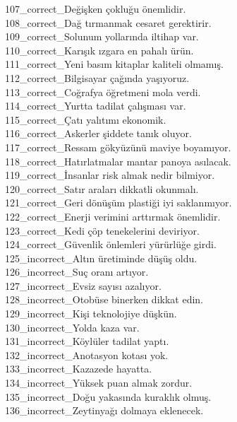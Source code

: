 \begin{myparindent}{0pt}
107\_correct\_Değişken çokluğu önemlidir. \\
108\_correct\_Dağ tırmanmak cesaret gerektirir. \\
109\_correct\_Solunum yollarında iltihap var. \\
110\_correct\_Karışık ızgara en pahalı ürün. \\
111\_correct\_Yeni basım kitaplar kaliteli olmamış. \\
112\_correct\_Bilgisayar çağında yaşıyoruz. \\
113\_correct\_Coğrafya öğretmeni mola verdi. \\
114\_correct\_Yurtta tadilat çalışması var. \\
115\_correct\_Çatı yalıtımı ekonomik. \\
116\_correct\_Askerler şiddete tanık oluyor. \\
117\_correct\_Ressam gökyüzünü maviye boyamıyor. \\
118\_correct\_Hatırlatmalar mantar panoya asılacak. \\
119\_correct\_İnsanlar risk almak nedir bilmiyor. \\
120\_correct\_Satır araları dikkatli okunmalı. \\
121\_correct\_Geri dönüşüm plastiği iyi saklanmıyor. \\
122\_correct\_Enerji verimini arttırmak önemlidir. \\
123\_correct\_Kedi çöp tenekelerini deviriyor. \\
124\_correct\_Güvenlik önlemleri yürürlüğe girdi. \\
125\_incorrect\_Altın üretiminde düşüş oldu. \\
126\_incorrect\_Suç oranı artıyor. \\
127\_incorrect\_Evsiz sayısı azalıyor. \\
128\_incorrect\_Otobüse binerken dikkat edin. \\
129\_incorrect\_Kişi teknolojiye düşkün. \\
130\_incorrect\_Yolda kaza var. \\
131\_incorrect\_Köylüler tadilat yaptı. \\
132\_incorrect\_Anotasyon kotası yok. \\
133\_incorrect\_Kazazede hayatta. \\
134\_incorrect\_Yüksek puan almak zordur. \\
135\_incorrect\_Doğu yakasında kuraklık olmuş. \\
136\_incorrect\_Zeytinyağı dolmaya eklenecek. \\

\end{myparindent}

